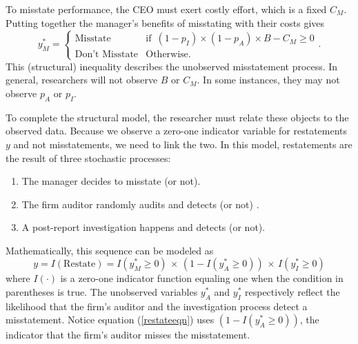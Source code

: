 To misstate performance, the CEO must exert costly effort, which is a fixed $C_M$. 
Putting together the manager's benefits of misstating with their costs gives
\begin{equation}\label{bencost}
y_M^* = \begin{cases}\mbox{Misstate} & \mbox{if }\, (1-p_I) \times (1-p_A) \times B - C_M \ge 0\\
\mbox{Don't Misstate} & \mbox{Otherwise}.\end{cases}.\end{equation}
This (structural) inequality describes the unobserved misstatement process. 
In general, researchers will not observe $B$ or $C_M$. 
In some instances, they may not observe $p_A$ or $p_I$.

To complete the structural model, the researcher must relate these objects to the observed data.
Because we observe a zero-one indicator variable for restatements $y$ and not misstatements, we need to link the two. 
In this model, restatements are the result of three stochastic processes:

\begin{enumerate}
\item The manager decides to misstate (or not).
\item The firm auditor randomly audits and detects (or not) .
\item A post-report investigation happens and detects (or not).
\end{enumerate}

Mathematically, this sequence can be modeled as
\begin{equation}\label{restateeqn}
 y = I(\mbox{Restate}) = I(y^*_M \ge 0) \, \times\, (1 - I(y^*_A \ge 0)) \, \times\, I(y^*_I \ge 0)
\end{equation}
where $I(\cdot)$ is a zero-one indicator function equaling one when the condition in parentheses is true.
The unobserved variables $y^*_A$ and $y^*_I$ respectively reflect the likelihood that the firm's
auditor and the investigation process detect a misstatement. Notice equation (\ref{restateeqn})
uses $(1 - I(y^*_A \ge 0))$, the indicator that the firm's auditor misses the misstatement.


